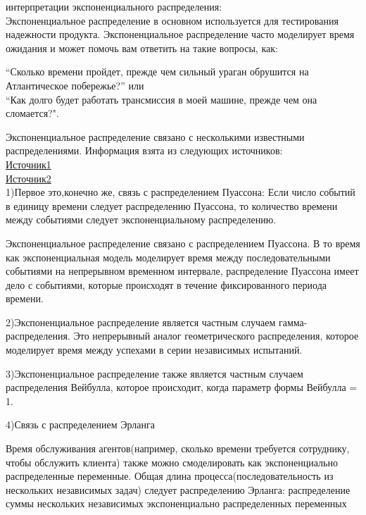 \documentclass[a4paper,12pt, oneside]{article}
\begin{document}
{ интерпретации} экспоненциального распределения:\\
Экспоненциальное распределение в основном используется для тестирования надежности продукта.
Экспоненциальное распределение часто моделирует время ожидания и может помочь вам ответить на такие вопросы, как:

“Сколько времени пройдет, прежде чем сильный ураган обрушится на Атлантическое побережье?” или\\
“Как долго будет работать трансмиссия в моей машине, прежде чем она сломается?".

\vspace{\baselineskip}
Экспоненциальное распределение связано с несколькими известными распределениями.
Информация взята из следующих источников:\\
\href{https://www.statisticshowto.datasciencecentral.com/exponential-distribution/}{Источник1}\\
\href{https://towardsdatascience.com/what-is-exponential-distribution-7bdd08590e2a}{Источник2}
\vspace{\baselineskip}\\
1)Первое это,конечно же, связь с распределением Пуассона:
Если число событий в единицу времени следует распределению Пуассона, то количество времени между событиями следует экспоненциальному распределению. 

Экспоненциальное распределение связано с распределением Пуассона. В то время как экспоненциальная модель моделирует время между последовательными событиями на непрерывном временном интервале, распределение Пуассона имеет дело с событиями, которые происходят в течение фиксированного периода времени. 

\vspace{\baselineskip}
2)Экспоненциальное распределение  является частным случаем гамма-распределения. Это непрерывный аналог геометрического распределения, которое моделирует время между успехами в серии независимых испытаний.

\vspace{\baselineskip}
3)Экспоненциальное распределение также является частным случаем распределения Вейбулла, которое происходит, когда параметр формы Вейбулла = 1.

\vspace{\baselineskip}
4)Связь с распределением Эрланга

Время обслуживания агентов(например, сколько времени требуется сотруднику, чтобы обслужить клиента) также можно смоделировать как экспоненциально распределенные переменные.
Общая длина процесса(последовательность из нескольких независимых задач) следует распределению Эрланга: распределение суммы нескольких независимых экспоненциально распределенных переменных
\end{document}
